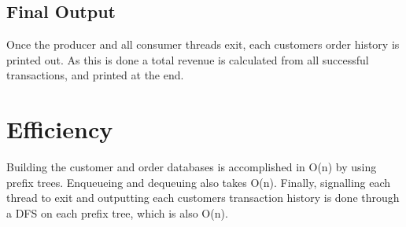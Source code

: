 \documentclass[letterpaper,12pt]{article}
\begin{document}
\subsection{Final Output}
Once the producer and all consumer threads exit, each customers order history is
printed out. As this is done a total revenue is calculated from all successful
transactions, and printed at the end.

\section{Efficiency}
Building the customer and order databases is accomplished in O(n) by using
prefix trees. Enqueueing and dequeuing also takes O(n). Finally, signalling each
thread to exit and outputting each customers transaction history is done through
a DFS on each prefix tree, which is also O(n).
\end{document}
